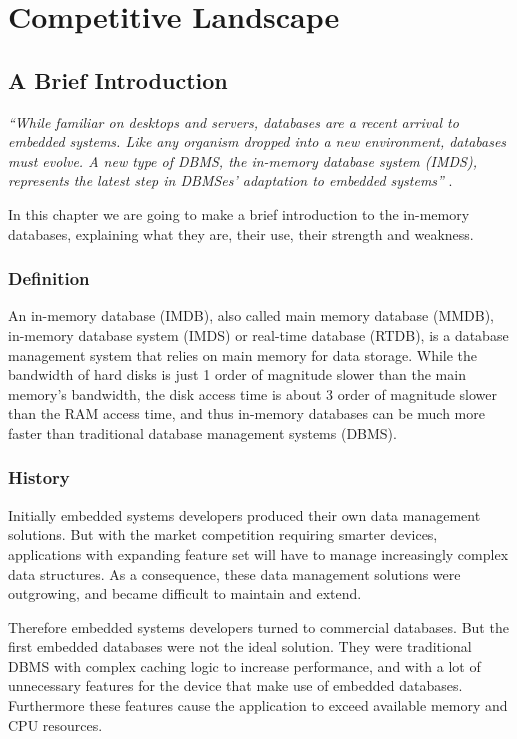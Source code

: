 
\part{Competitive Landscape}

\chapter{A Brief Introduction}
	\emph{
		``While familiar on desktops and servers, databases are a recent arrival to embedded systems. 
		Like any organism dropped into a new environment, databases must evolve. 
		A new type of DBMS, the in-memory database system (IMDS), represents the latest 
		step in DBMSes' adaptation to embedded systems'' 
	}\cite{Graves}.
	
	In this chapter we are going to make a brief introduction to the in-memory databases, explaining what they are, their use, their strength and weakness.
	
	\section{Definition}
		An in-memory database (IMDB), also called main memory database (MMDB), 
		in-memory database system (IMDS) or real-time database (RTDB), 
		is a database management system	that relies on main memory for data storage. 
		While the bandwidth of hard disks is just 1 order of magnitude slower than the 
		main memory's bandwidth, the disk access time is about 3 order of magnitude 
		slower than the RAM access time, and thus in-memory databases can be much more faster 
		than traditional database management systems (DBMS).
		
	\section{History}
		Initially embedded systems developers produced their own data management solutions. 
		But with the market competition requiring smarter devices, applications with 
		expanding feature set will have to manage increasingly complex data structures. 
		As a consequence, these data 
		management solutions were outgrowing, and became difficult to maintain and extend. 
		
		Therefore embedded systems developers turned to commercial databases. But the first 
		embedded databases were not the ideal solution. They were traditional DBMS with
		complex caching logic to increase performance, and with a lot of unnecessary features 
		for the device that make use of embedded databases. Furthermore these features cause 
		the application to exceed available memory and CPU resources.
		

